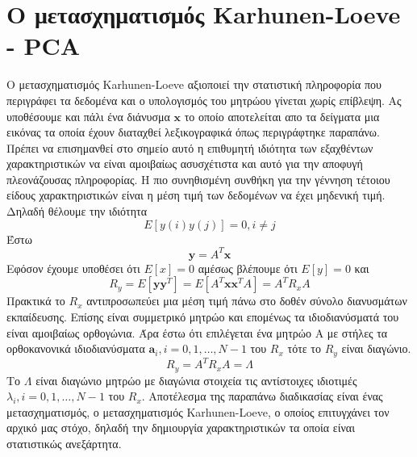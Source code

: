 \section{Ο μετασχηματισμός \textlatin{Karhunen-Loeve} - \textlatin{PCA}}
\par
Ο μετασχηματισμός \textlatin{Karhunen-Loeve} αξιοποιεί την στατιστική πληροφορία που περιγράφει τα δεδομένα και ο υπολογισμός του μητρώου γίνεται χωρίς επίβλεψη. Ας υποθέσουμε και πάλι ένα διάνυσμα $\mathbf{x}$ το οποίο αποτελείται απο τα δείγματα μια εικόνας τα οποία έχουν διαταχθεί λεξικογραφικά όπως περιγράφτηκε παραπάνω. Πρέπει να επισημανθεί στο σημείο αυτό η επιθυμητή ιδιότητα των εξαχθέντων χαρακτηριστικών να είναι αμοιβαίως ασυσχέτιστα και αυτό για την αποφυγή πλεονάζουσας πληροφορίας. Η πιο συνηθισμένη συνθήκη για την γέννηση τέτοιου είδους χαρακτηριστικών είναι η μέση τιμή των δεδομένων να έχει μηδενική τιμή. Δηλαδή θέλουμε την ιδιότητα
\newline\hspace*{\fill}
\begin{equation}
        Ε[y(i)y(j)]=0,i \neq j
\end{equation}
\hspace*{\fill}\newline
Έστω 
\newline\hspace*{\fill}
\begin{equation}
        \mathbf{y} = A^{T}\mathbf{x}
\end{equation}
\hspace*{\fill}\newline
Εφόσον έχουμε υποθέσει ότι $Ε[x]=0$ αμέσως βλέπουμε ότι $Ε[y]=0$ και 
\newline\hspace*{\fill}
\begin{equation}
        R_{y}=E[\mathbf{y}\mathbf{y}^{T}]=E[A^{T} \mathbf{x}\mathbf{x}^{T} A]=A^{T}R_{x}A
\end{equation}
\hspace*{\fill}\newline
Πρακτικά το $R_{x}$ αντιπροσωπεύει μια μέση τιμή πάνω στο δοθέν σύνολο διανυσμάτων εκπαίδευσης. Επίσης είναι συμμετρικό μητρώο και επομένως τα ιδιοδιανύσματά του είναι αμοιβαίως ορθογώνια. Άρα έστω ότι επιλέγεται ένα μητρώο Α με στήλες τα ορθοκανονικά ιδιοδιανύσματα $\mathbf{a}_{i},i=0,1,\ldots,N-1$ του $R_{x}$  τότε το $R_{y}$ είναι διαγώνιο.
\newline\hspace*{\fill}
\begin{equation}
        R_{y}=A^{T}R_{x}A=\Lambda
\end{equation}
\hspace*{\fill}\newline
Το $\Lambda$ είναι διαγώνιο μητρώο με διαγώνια στοιχεία τις αντίστοιχες ιδιοτιμές $\lambda_{i},i=0,1,\ldots,N-1$ του $R_{x}$. Αποτέλεσμα της παραπάνω διαδικασίας είναι ένας μετασχηματισμός, ο μετασχηματισμός \textlatin{Karhunen-Loeve}, ο οποίος επιτυγχάνει τον αρχικό μας στόχο, δηλαδή την δημιουργία χαρακτηριστικών τα οποία είναι στατιστικώς ανεξάρτητα.

